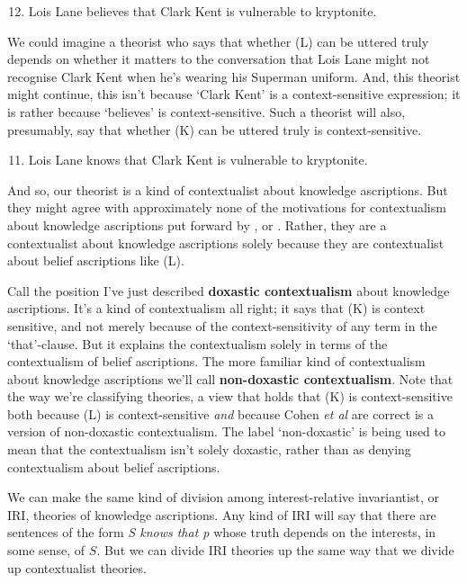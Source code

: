 \begin{enumerate}
\setcounter{enumi}{11}
\renewcommand{\labelenumi}{(\Alph{enumi})}
\item Lois Lane believes that Clark Kent is vulnerable to kryptonite.
\end{enumerate}

\noindent We could imagine a theorist who says that whether (L) can be uttered truly depends on whether it matters to the conversation that Lois Lane might not recognise Clark Kent when he's wearing his Superman uniform. And, this theorist might continue, this isn't because `Clark Kent' is a context-sensitive expression; it is rather because `believes' is context-sensitive.  Such a theorist will also, presumably, say that whether (K) can be uttered truly is context-sensitive.

\begin{enumerate}
\setcounter{enumi}{10}
\renewcommand{\labelenumi}{(\Alph{enumi})}
\item Lois Lane knows that Clark Kent is vulnerable to kryptonite.
\end{enumerate}

\noindent And so, our theorist is a kind of contextualist about knowledge ascriptions. But they might agree with approximately none of the motivations for contextualism about knowledge ascriptions put forward by \citet{Cohen1988}, \citet{DeRose1995} or \citet{Lewis1996b}. Rather, they are a contextualist about knowledge ascriptions solely because they are contextualist about belief ascriptions like (L).

Call the position I've just described \textbf{doxastic contextualism} about knowledge ascriptions. It's a kind of contextualism all right; it says that (K) is context sensitive, and not merely because of the context-sensitivity of any term in the `that'-clause. But it explains the contextualism solely in terms of the contextualism of belief ascriptions. The more familiar kind of contextualism about knowledge ascriptions we'll call \textbf{non-doxastic contextualism}. Note that the way we're classifying theories, a view that holds that (K) is context-sensitive both because (L) is context-sensitive \textit{and} because Cohen \textit{et al} are correct is a version of non-doxastic contextualism. The label `non-doxastic' is being used to mean that the contextualism isn't solely doxastic, rather than as denying contextualism about belief ascriptions.

We can make the same kind of division among interest-relative invariantist, or IRI, theories of knowledge ascriptions. Any kind of IRI will say that there are sentences of the form \textit{S knows that p} whose truth depends on the interests, in some sense, of $S$. But we can divide IRI theories up the same way that we divide up contextualist theories.

